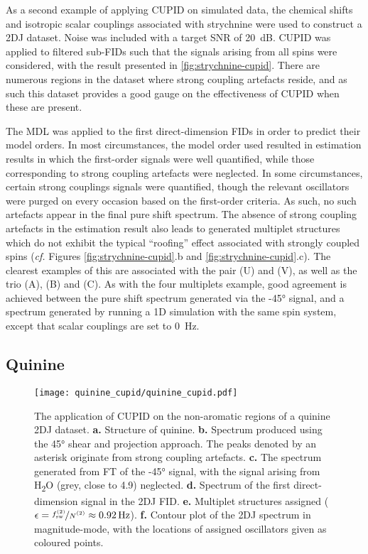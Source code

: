 As a second example of applying \ac{CUPID} on simulated data, the chemical
shifts and isotropic scalar couplings associated with strychnine
were used to construct a 2DJ dataset. Noise was included with a target
\ac{SNR} of \qty{20}{\deci\bel}. CUPID was applied to filtered
sub-FIDs such that the signals arising from all spins were considered, with the
result presented in \cref{fig:strychnine-cupid}. There are numerous
regions in the dataset where strong coupling artefacts reside, and as such this
dataset provides a good gauge on the effectiveness of \ac{CUPID} when these are
present.

The \ac{MDL} was applied to the first direct-dimension \acp{FID} in order to
predict their model orders. In most circumstances, the model order used resulted
in estimation results in which the first-order signals were well
quantified, while those corresponding to strong coupling artefacts were neglected.
In some circumstances, certain strong couplings signals were quantified, though
the relevant oscillators were purged on every occasion based on the first-order
criteria. As such, no such artefacts appear in the final pure shift spectrum.
The absence of strong coupling artefacts in the estimation result also leads to
generated multiplet structures which do not exhibit the typical ``roofing''
effect associated with strongly coupled spins (\textit{cf.} Figures
\ref{fig:strychnine-cupid}.b and \ref{fig:strychnine-cupid}.c). The clearest
examples of this are associated with the pair (U) and (V), as well as the trio (A),
(B) and (C). As with the four multiplets example, good agreement is achieved
between the pure shift spectrum generated via the \ang{-45} signal, and a
spectrum generated by running a \ac{1D} simulation with the same spin system,
except that scalar couplings are set to \qty{0}{\hertz}.

\subsection{Quinine}
\begin{figure}
    \centering
    \texttt{[image: quinine\_cupid/quinine\_cupid.pdf]}
    \caption[
        The application of \acs{CUPID} on a quinine \acs{2DJ} dataset.
    ]{
        The application of \ac{CUPID} on the non-aromatic regions of a quinine
        \ac{2DJ} dataset.
        \textbf{a.} Structure of quinine.
        \textbf{b.} Spectrum produced using the \ang{45} shear and projection
        approach. The peaks denoted by an asterisk originate from strong
        coupling artefacts.
        \textbf{c.} The spectrum generated from \ac{FT} of the \ang{-45}
        signal, with the signal arising from H\textsubscript{2}O (grey, close
        to \qty{4.9}{\partspermillion}) neglected.
        \textbf{d.} Spectrum of the first direct-dimension signal in the
        \ac{2DJ} \ac{FID}.
        \textbf{e.} Multiplet structures assigned ($\epsilon =
        \nicefrac{\fswtwo}{\Ntwo} \approx \qty{0.92}{\hertz}$).
        \textbf{f.} Contour plot of the \ac{2DJ} spectrum in magnitude-mode,
        with the locations of assigned oscillators given as coloured points.
    }
    \label{fig:quinine-cupid}
\end{figure}

